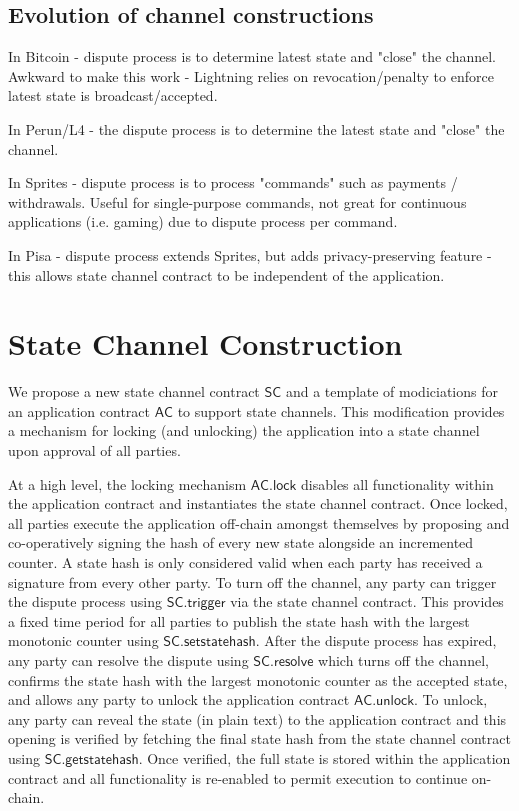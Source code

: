 \documentclass{llncs}
\newcommand{\statechannel}{\mathsf{SC}}
\newcommand{\statechanneldispute}{\mathsf{SC}.\mathsf{trigger}}
\newcommand{\statechannelsetstate}{\mathsf{SC}.\mathsf{setstatehash}}
\newcommand{\statechannelresolve}{\mathsf{SC}.\mathsf{resolve}}
\newcommand{\statechannelgetcommitment}{\mathsf{SC}.\mathsf{getstatehash}}
\newcommand{\appcontract}{\mathsf{AC}}
\newcommand{\applock}{\mathsf{AC.lock}}
\newcommand{\appunlock}{\mathsf{AC.unlock}}
\begin{document}
\subsection{Evolution of channel constructions}

In Bitcoin - dispute process is to determine latest state and "close" the channel. Awkward to make this work - Lightning relies on revocation/penalty to enforce latest state is broadcast/accepted. 

In Perun/L4 - the dispute process is to determine the latest state and "close" the channel. 

In Sprites - dispute process is to process "commands" such as payments / withdrawals. Useful for single-purpose commands, not great for continuous applications (i.e. gaming) due to dispute process per command.

In Pisa - dispute process extends Sprites, but adds privacy-preserving feature - this allows state channel contract to be independent of the application. 

\section{State Channel Construction} 

We propose a new state channel contract $\statechannel$ and a template of modiciations for an application contract $\appcontract$  to support state channels. 
This modification provides a mechanism for locking (and unlocking) the application into a state channel upon approval of all parties. 

At a high level, the locking mechanism $\applock$ disables all functionality within the application contract and instantiates the state channel contract. 
Once locked, all parties execute the application off-chain amongst themselves by proposing  and co-operatively signing the hash of every new state alongside an incremented counter. 
A state hash is only considered valid when each party has received a signature from every other party. 
To turn off the channel, any party can trigger the dispute process using $\statechanneldispute$ via the state channel contract.
This provides  a fixed time period  for all parties to publish the state hash with the largest monotonic counter using $\statechannelsetstate$. 
After the dispute process has expired, any party can resolve the dispute using $\statechannelresolve$ which turns off the channel, confirms the state hash with the largest monotonic counter as the accepted state, and allows any party to unlock the application contract $\appunlock$. 
To unlock, any party can reveal the state (in plain text) to the application contract and this opening is verified by fetching the final state hash from the state channel contract using  $\statechannelgetcommitment$. 
Once verified, the full state is stored within the application contract and all functionality is re-enabled to permit execution to continue on-chain. 
\end{document}
